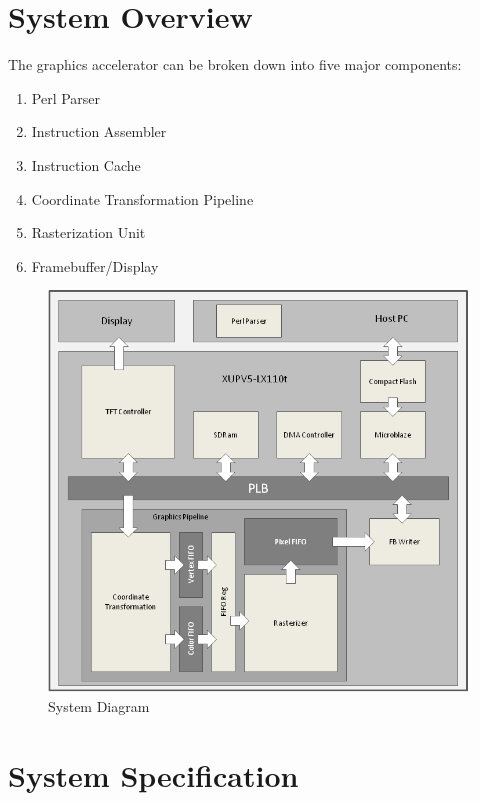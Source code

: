 \documentclass[letterpaper,10pt]{article}
\begin{document}
\section{System Overview}
The graphics accelerator can be broken down into five major components:
\begin{enumerate}

\item Perl Parser

\item Instruction Assembler

\item Instruction Cache

\item Coordinate Transformation Pipeline

\item Rasterization Unit

\item Framebuffer/Display

\end{enumerate}
\begin{figure}[h!]
\begin{center}
\includegraphics[scale=.70]{system.png}
\end{center}
\caption{System Diagram}
\label{fig:system}
\end{figure}

\section{System Specification}
\end{document}
